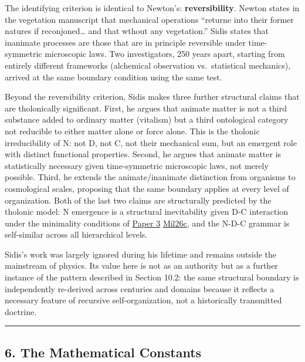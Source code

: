 \documentclass[
  11pt,
  letterpaper,
]{article}
\begin{document}
The identifying criterion is identical to Newton's:
\textbf{reversibility}. Newton states in the vegetation manuscript that
mechanical operations ``returne into their former natures if
reconjoned\ldots{} and that wthout any vegetation.'' Sidis states that
inanimate processes are those that are in principle reversible under
time-symmetric microscopic laws. Two investigators, 250 years apart,
starting from entirely different frameworks (alchemical observation
vs.~statistical mechanics), arrived at the same boundary condition using
the same test.

Beyond the reversibility criterion, Sidis makes three further structural
claims that are tholonically significant. First, he argues that animate
matter is not a third substance added to ordinary matter (vitalism) but
a third ontological category not reducible to either matter alone or
force alone. This is the tholonic irreducibility of N: not D, not C, not
their mechanical sum, but an emergent role with distinct functional
properties. Second, he argues that animate matter is statistically
necessary given time-symmetric microscopic laws, not merely possible.
Third, he extends the animate/inanimate distinction from organisms to
cosmological scales, proposing that the same boundary applies at every
level of organization. Both of the last two claims are structurally
predicted by the tholonic model: N emergence is a structural
inevitability given D-C interaction under the minimality conditions of
\href{https://github.com/baardev/truevalue/blob/main/docnav/Research/papers/3_minimal-recursive-triadic-framework/3_minimal-recursive-triadic-framework.pdf}{Paper
3}
\href{https://github.com/baardev/truevalue/blob/main/docnav/Research/papers/3_minimal-recursive-triadic-framework/3_minimal-recursive-triadic-framework.pdf}{Mil26c},
and the N-D-C grammar is self-similar across all hierarchical levels.

Sidis's work was largely ignored during his lifetime and remains outside
the mainstream of physics. Its value here is not as an authority but as
a further instance of the pattern described in Section 10.2: the same
structural boundary is independently re-derived across centuries and
domains because it reflects a necessary feature of recursive
self-organization, not a historically transmitted doctrine.

\begin{center}\rule{0.5\linewidth}{0.5pt}\end{center}

\subsection{6. The Mathematical
Constants}\label{the-mathematical-constants}
\end{document}
